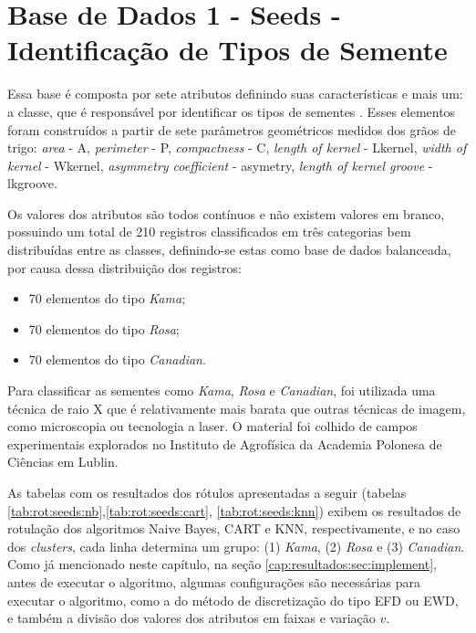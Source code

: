 

\section{Base de Dados 1 - Seeds - Identificação de Tipos de Semente}
Essa base é composta por sete  atributos definindo suas características e mais um: a  classe, que é responsável por identificar os tipos de sementes \cite{Charytanowicz2010}. Esses elementos foram construídos a partir de sete parâmetros geométricos medidos dos grãos de trigo: \textit{area} - A, \textit{perimeter} - P, \textit{compactness} - C, \textit{length of kernel} - Lkernel, \textit{width of kernel} - Wkernel, \textit{asymmetry coefficient} - asymetry, \textit{length of kernel groove} - lkgroove.


Os valores dos atributos são todos contínuos e não existem valores em branco, possuindo um total de 210 registros classificados em três categorias bem distribuídas entre as classes, definindo-se estas como base de dados balanceada, por causa dessa distribuição dos registros:

\begin{itemize}[noitemsep]
 \item 70 elementos do tipo \textit{Kama};
 \item 70 elementos do tipo \textit{Rosa};
 \item 70 elementos do tipo \textit{Canadian}.
\end{itemize}


Para classificar as sementes como \textit{Kama}, \textit{Rosa} e \textit{Canadian}, foi utilizada uma técnica de raio X que é relativamente mais barata que outras técnicas de imagem, como microscopia ou tecnologia a laser. O material foi colhido de campos experimentais explorados no Instituto de Agrofísica da Academia Polonesa de Ciências em Lublin. 

As tabelas com os resultados dos rótulos apresentadas a seguir (tabelas \ref{tab:rot:seeds:nb},\ref{tab:rot:seeds:cart}, \ref{tab:rot:seeds:knn}) exibem os resultados de rotulação dos algoritmos Naive Bayes, CART e KNN, respectivamente, e no caso dos \textit{clusters}, cada linha determina um grupo: (1) \textit{Kama}, (2) \textit{Rosa} e (3) \textit{Canadian}. Como já mencionado neste capítulo, na seção \ref{cap:resultados:sec:implement}, antes de executar o algoritmo, algumas configurações são necessárias para executar o algoritmo, como a do método de discretização do tipo EFD ou EWD, e também a divisão dos valores dos atributos em faixas e variação ${v}$.

